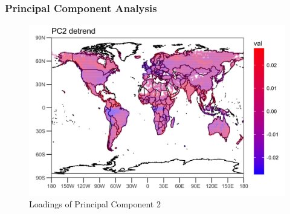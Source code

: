 \documentclass{beamer}
\begin{document}
\begin{frame}
\frametitle{Principal Component Analysis}
\begin{figure}
\centering
\includegraphics[width=0.9\linewidth]{../img/loading_PC2_de}
\caption{Loadings of Principal Component 2}
\label{fig:loadingpc2}
\end{figure}
\end{frame}

%
%
%
\end{document}
